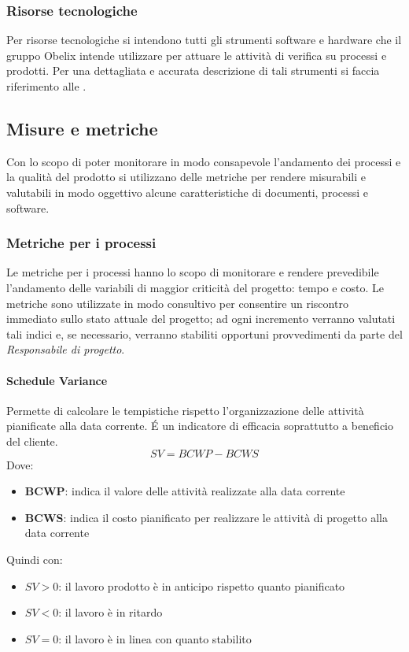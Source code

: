\subsubsection{Risorse tecnologiche}
Per risorse tecnologiche si intendono
tutti gli strumenti software e hardware che il gruppo Obelix intende
utilizzare per attuare le attività di verifica su processi e
prodotti. Per una dettagliata e accurata descrizione di tali strumenti
si faccia riferimento alle \normediprogetto.



\subsection{Misure e metriche}
Con lo scopo di poter monitorare in modo consapevole l'andamento dei
processi e la qualità del prodotto si utilizzano delle metriche per
rendere misurabili e valutabili in modo oggettivo alcune
caratteristiche di documenti, processi e software.


\subsubsection{Metriche per i processi}
Le metriche per i processi hanno lo scopo  di monitorare e rendere
prevedibile l'andamento delle variabili di maggior criticità del
progetto: tempo e costo. Le metriche sono utilizzate in modo consultivo
per consentire un riscontro immediato sullo stato attuale del
progetto; ad ogni incremento verranno valutati tali indici e, se
necessario, verranno stabiliti opportuni provvedimenti da parte del  \emph{Responsabile di progetto}.

\paragraph{Schedule Variance}
Permette di calcolare le tempistiche rispetto l'organizzazione delle attività pianificate alla data
corrente. \'E un indicatore di efficacia soprattutto a beneficio del
cliente.
$$
SV = BCWP − BCWS
$$
Dove:
\begin{itemize}
\item \textbf{BCWP}: indica il valore delle attività realizzate alla data corrente
\item \textbf{BCWS}: indica il costo pianificato per realizzare le attività di progetto alla data corrente
\end{itemize}
Quindi con:
\begin{itemize}
\item $SV>0$: il lavoro prodotto è in anticipo rispetto quanto pianificato
\item $SV<0$: il lavoro è in ritardo
\item $SV=0$: il lavoro è in linea con quanto stabilito
\end{itemize}

